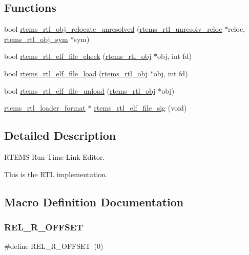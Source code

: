 \subsection*{Functions}
\begin{DoxyCompactItemize}
\item 
bool \mbox{\hyperlink{rtl-elf_8c_ad6bfd56d63e3cf2562d48a39b7fffc24}{rtems\+\_\+rtl\+\_\+obj\+\_\+relocate\+\_\+unresolved}} (\mbox{\hyperlink{structrtems__rtl__unresolv__reloc}{rtems\+\_\+rtl\+\_\+unresolv\+\_\+reloc}} $\ast$reloc, \mbox{\hyperlink{structrtems__rtl__obj__sym}{rtems\+\_\+rtl\+\_\+obj\+\_\+sym}} $\ast$sym)
\item 
bool \mbox{\hyperlink{rtl-elf_8c_a83c2600373c123a070d3762fbb90d367}{rtems\+\_\+rtl\+\_\+elf\+\_\+file\+\_\+check}} (\mbox{\hyperlink{structrtems__rtl__obj}{rtems\+\_\+rtl\+\_\+obj}} $\ast$obj, int fd)
\item 
bool \mbox{\hyperlink{rtl-elf_8c_a6432bdb0006ee34a7b89b3f3088aa5b5}{rtems\+\_\+rtl\+\_\+elf\+\_\+file\+\_\+load}} (\mbox{\hyperlink{structrtems__rtl__obj}{rtems\+\_\+rtl\+\_\+obj}} $\ast$obj, int fd)
\item 
bool \mbox{\hyperlink{rtl-elf_8c_a11980d1727cffdcc360b8f2d02e836df}{rtems\+\_\+rtl\+\_\+elf\+\_\+file\+\_\+unload}} (\mbox{\hyperlink{structrtems__rtl__obj}{rtems\+\_\+rtl\+\_\+obj}} $\ast$obj)
\item 
\mbox{\hyperlink{structrtems__rtl__loader__format}{rtems\+\_\+rtl\+\_\+loader\+\_\+format}} $\ast$ \mbox{\hyperlink{rtl-elf_8c_a89a86f305b09923b92f18b72a5478427}{rtems\+\_\+rtl\+\_\+elf\+\_\+file\+\_\+sig}} (void)
\end{DoxyCompactItemize}


\subsection{Detailed Description}
R\+T\+E\+MS Run-\/\+Time Link Editor. 

This is the R\+TL implementation. 

\subsection{Macro Definition Documentation}
\mbox{\label{rtl-elf_8c_a8809de6f03e511a56892b94bb0ed49dd}} 
\subsubsection{\texorpdfstring{REL\_R\_OFFSET}{REL\_R\_OFFSET}}
{\footnotesize\ttfamily \#define R\+E\+L\+\_\+\+R\+\_\+\+O\+F\+F\+S\+ET~(0)}

